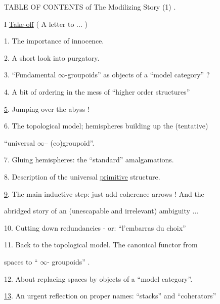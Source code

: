 \enlargethispage{-3pt}

\par

TABLE OF CONTENTS of The Modilizing Story (1) .\par

I \uline{Take-off} ( A letter to ... )\par

1. The importance of innocence.\par
2. A short look into purgatory.\par
3. ``Fundamental $\infty$-groupoids'' as objects of a ``model category'' ?\par
4. A bit of ordering in the mess of ``higher order structures''\par
\uline{5}. Jumping over the abyss !\par
6. The topological model; hemispheres building up the (tentative)\par
``universal $\infty$-- (co)groupoid''.\par
7. Gluing hemispheres: the ``standard'' amalgamations.\par
8. Description of the universal \uline{primitive} structure.\par
\uline{9}. The main inductive step: just add coherence arrows ! And the\par
abridged story of an (unescapable and irrelevant) ambiguity ...\par
10. Cutting down redundancies - or: ``l'embarras du choix''\par
\unsure{\hand{\textasciicircum}}11. Back to the topological model. The canonical functor from\par
spaces to `` $\infty$- groupoids'' .\par
12. About replacing spaces by objects of a ``model category''.\par
\uline{13}. An urgent reflection on proper names: ``stacks'' and ``coherators''\par

